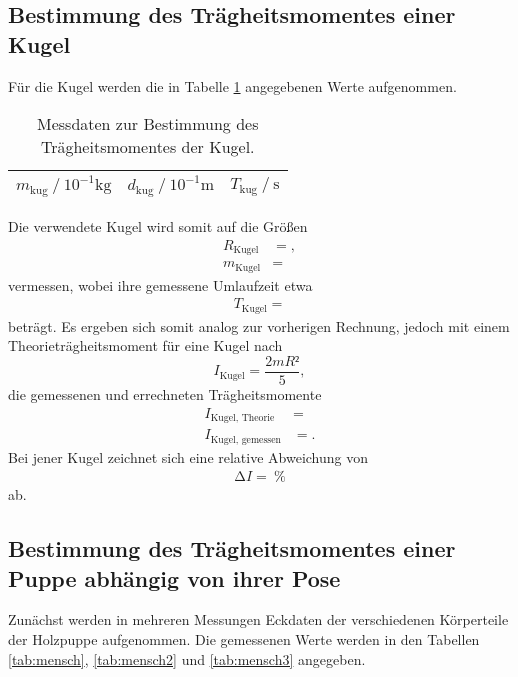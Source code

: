 \subsection{Bestimmung des Trägheitsmomentes einer Kugel}
Für die Kugel werden die in Tabelle \ref{tab:kug} angegebenen Werte aufgenommen.

\begin{table}[H]
  \centering
  \caption{Messdaten zur Bestimmung des Trägheitsmomentes der Kugel.}
  \label{tab:kug}
  \begin{tabular}{c c c}
    \toprule
    {$m_\text{kug} \ /\ 10^{-1} \si{\kilo\gram}$} & {$d_\text{kug} \ /\ 10^{-1} \si{\metre}$} & {$T_\text{kug} \ /\ \si{\second}$}\\
    \midrule
    
    \bottomrule
  \end{tabular}
\end{table}

Die verwendete Kugel wird somit auf die Größen
\begin{align*}
  R_{\text{Kugel}} &= , \\
  m_{\text{Kugel}} &= 
\end{align*}
vermessen, wobei ihre gemessene Umlaufzeit etwa
\begin{align*}
  T_{\text{Kugel}} = 
\end{align*}
beträgt.
Es ergeben sich somit analog zur vorherigen Rechnung, jedoch mit einem Theorieträgheitsmoment für eine Kugel nach
\begin{equation}
  I_{\text{Kugel}} = \frac{2mR²}{5},
\end{equation}
die gemessenen und errechneten Trägheitsmomente
\begin{align*}
  I_{\text{Kugel, Theorie}}  &=  \\
  I_{\text{Kugel, gemessen}} &= .
\end{align*}
Bei jener Kugel zeichnet sich eine relative Abweichung von
\begin{align*}
  \increment I =  \:\si{\percent}
\end{align*}
ab.


\subsection{Bestimmung des Trägheitsmomentes einer Puppe abhängig von ihrer Pose}
Zunächst werden in mehreren Messungen Eckdaten der verschiedenen Körperteile der Holzpuppe aufgenommen.
Die gemessenen Werte werden in den Tabellen \ref{tab:mensch}, \ref{tab:mensch2} und \ref{tab:mensch3} angegeben.

